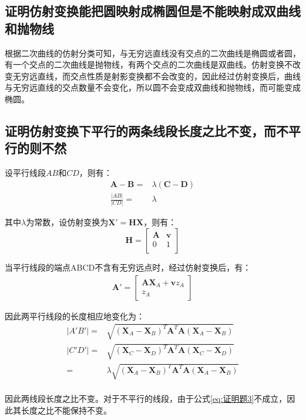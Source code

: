 \documentclass[11pt]{article}
\begin{document}
\subsection{证明仿射变换能把圆映射成椭圆但是不能映射成双曲线和抛物线}
根据二次曲线的仿射分类可知，与无穷远直线没有交点的二次曲线是椭圆或者圆，有一个交点的二次曲线是抛物线，有两个交点的二次曲线是双曲线。仿射变换不改变无穷远直线，而交点性质是射影变换都不会改变的，因此经过仿射变换后，曲线与无穷远直线的交点数量不会变化，所以圆不会变成双曲线和抛物线，而可能变成椭圆。
\subsection{证明仿射变换下平行的两条线段长度之比不变，而不平行的则不然}
设平行线段$AB$和$CD$，则有：
$$
\begin{aligned}
\mathbf{A-B}=&\lambda(\mathbf{C-D})\\
\frac{|AB|}{|CD|}=&\lambda
\label{eq:证明题3}
\end{aligned}
$$\par
其中$\lambda$为常数，设仿射变换为$\mathbf{X}'=\mathbf{HX}$，则有：
$$
\mathbf{H}=\begin{bmatrix}
  \mathbf{A}& \mathbf{v}\\
   0&1\\
\end{bmatrix}
$$\par
当平行线段的端点ABCD不含有无穷远点时，经过仿射变换后，有：
$$
\begin{aligned}
\mathbf{A}'=\begin{bmatrix}
\mathbf{AX}_A+\mathbf{v}z_A\\
z_A
\end{bmatrix}
\end{aligned}
$$\par
因此两平行线段的长度相应地变化为：
$$
\begin{aligned}
|A'B'|=&\sqrt{(\mathbf{X}_A-\mathbf{X}_B)^T\mathbf{A}^T\mathbf{A}(\mathbf{X}_A-\mathbf{X}_B)}\\
|C'D'|=&\sqrt{(\mathbf{X}_C-\mathbf{X}_D)^T\mathbf{A}^T\mathbf{A}(\mathbf{X}_C-\mathbf{X}_D)}\\
=&\lambda\sqrt{(\mathbf{X}_A-\mathbf{X}_B)^T\mathbf{A}^T\mathbf{A}(\mathbf{X}_A-\mathbf{X}_B)}\\
\end{aligned}
$$\par
因此两线段长度之比不变。对于不平行的线段，由于公式\ref{eq:证明题3}不成立，因此其长度之比不能保持不变。
\end{document}
